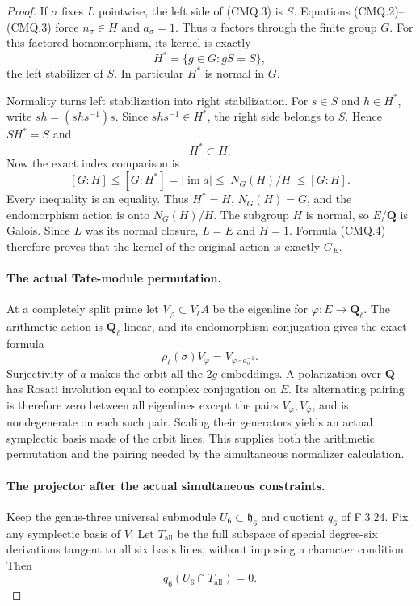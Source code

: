 \begin{proof}
If $\sigma$ fixes $L$ pointwise, the left side of
(CMQ.3) is $S$. Equations (CMQ.2)--(CMQ.3) force
$n_\sigma\in H$ and $a_\sigma=1$. Thus $a$ factors
through the finite group $G$. For this factored
homomorphism, its kernel is exactly
\[
                 H^*=\{g\in G:gS=S\},                    \tag{CMQ.4}
\]
the left stabilizer of $S$. In particular $H^*$ is
normal in $G$.

Normality turns left stabilization into right
stabilization. For $s\in S$ and $h\in H^*$, write
$sh=(shs^{-1})s$. Since $shs^{-1}\in H^*$, the
right side belongs to $S$. Hence $SH^*=S$ and
\[
                                H^*\subset H.              \tag{CMQ.5}
\]
Now the exact index comparison is
\[
 [G:H]\leq [G:H^*]=|\operatorname{im}a|
       \leq|N_G(H)/H|\leq[G:H].                            \tag{CMQ.6}
\]
Every inequality is an equality. Thus $H^*=H$,
$N_G(H)=G$, and the endomorphism action is onto
$N_G(H)/H$. The subgroup $H$ is normal, so $E/\mathbf Q$
is Galois. Since $L$ was its normal closure, $L=E$
and $H=1$. Formula (CMQ.4) therefore proves that the
kernel of the original action is exactly $G_E$.

\paragraph{The actual Tate-module permutation.}
At a completely split prime let
$V_\varphi\subset V_\ell A$ be the eigenline for
$\varphi:E\to\mathbf Q_\ell$. The arithmetic action
is $\mathbf Q_\ell$-linear, and its endomorphism
conjugation gives the exact formula
\[
 \rho_\ell(\sigma)V_\varphi
                    =V_{\varphi\circ a_\sigma^{-1}}.       \tag{CMQ.7}
\]
Surjectivity of $a$ makes the orbit all the
$2g$ embeddings. A polarization over $\mathbf Q$
has Rosati involution equal to complex conjugation
on $E$. Its alternating pairing is therefore zero
between all eigenlines except the pairs
$V_\varphi,V_{\bar\varphi}$, and is nondegenerate
on each such pair. Scaling their generators yields
an actual symplectic basis made of the orbit lines.
This supplies both the arithmetic permutation and
the pairing needed by the simultaneous normalizer
calculation.


\paragraph{The projector after the actual simultaneous constraints.}
Keep the genus-three universal submodule $U_6\subset\mathfrak h_6$
and quotient $q_6$ of F.3.24. Fix any symplectic basis of $V$.
Let $T_{\mathrm{all}}$ be the full subspace of special degree-six
derivations tangent to all six basis lines, without imposing a
character condition. Then
\[
                         q_6(U_6\cap T_{\mathrm{all}})=0.       \tag{QCM.1}
\]


\end{proof}
